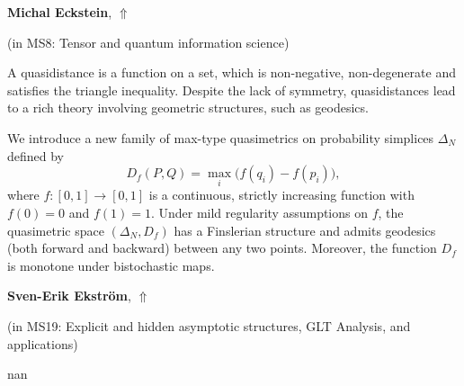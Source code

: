 \documentclass[ILAS2025-program.tex]{subfiles}
\begin{document}
     \hypertarget{down0052}{}\begin{ilasabstract}
    
    \textbf{Michal Eckstein},  \hfill \hyperlink{up0052}{$\Uparrow$}
    
    (in {\color{mstitle}MS8: Tensor and quantum information science})
        
        \mtskip
    A quasidistance is a function on a set, which is non-negative, non-degenerate and satisfies the triangle inequality. Despite the lack of symmetry, quasidistances lead to a rich theory involving geometric structures, such as geodesics. 


We introduce a new family of max-type quasimetrics on probability simplices $\Delta_N$ defined by
\[
D_f(P,Q) = \max_i \big( f(q_i) - f(p_i) \big),
\]
where \(f\colon [0,1]\to [0,1]\) is a continuous, strictly increasing function with \(f(0)=0\) and \(f(1)=1\). Under mild regularity assumptions on \(f\), the quasimetric space $(\Delta_N,D_f)$ has a Finslerian structure and admits geodesics (both forward and backward) between any two points. Moreover, the function \(D_f\) is monotone under bistochastic maps.
\end{ilasabstract}
     \hypertarget{down0258}{}\begin{ilasabstract}
    
    \textbf{Sven-Erik Ekström},  \hfill \hyperlink{up0258}{$\Uparrow$}
    
    (in {\color{mstitle}MS19: Explicit and hidden asymptotic structures, GLT Analysis, and applications})
        
        \mtskip
    nan\end{ilasabstract}
\end{document}
